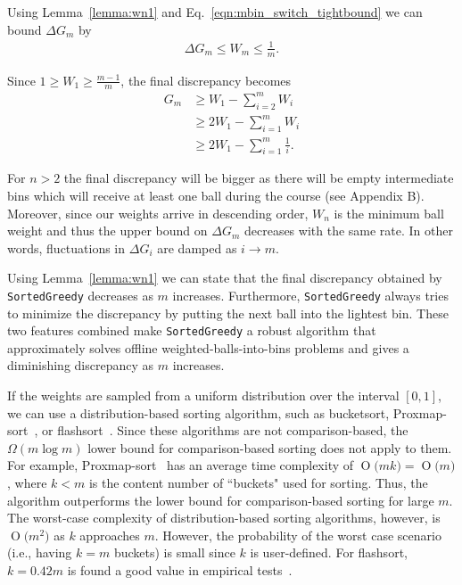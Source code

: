 \documentclass[12pt,psfig,a4]{article}
\newcommand{\sg}{\texttt{SortedGreedy}}
\newcommand{\BigO}[1]{\ensuremath{\operatorname{O}\bigl(#1\bigr)}}
\theoremstyle{plain}
\begin{document}
Using Lemma~\ref{lemma:wn1} and Eq.~\ref{eqn:mbin_switch_tightbound} we can bound $\Delta G_m$ by
 \begin{align}
   \Delta G_m \leq W_m \leq \frac{1}{m}. 
   \label{eqn:bounding2}
 \end{align}
 
Since $1\ge W_1 \geq \frac{m-1}{m} $, the final discrepancy becomes
   \begin{align}
   \nonumber
   G_m & \geq  W_1 - \sum_{i=2}^{m} W_i \\ \nonumber
   & \geq 2W_1 - \sum_{i=1}^{m} W_i \\
   & \geq 2W_1 - \sum_{i=1}^{m} \frac{1}{i}  .
   \label{eqn:gn_sg1}
 \end{align}

For $n>2$ the final discrepancy will be bigger as there will be empty intermediate bins which will receive at least one ball during the course (see Appendix B). Moreover, since our weights arrive in descending order, $W_n$ is the minimum ball weight and thus the upper bound on $\Delta G_m$ decreases with the same rate. In other words, fluctuations in $\Delta G_i$ are damped as $i\to m$. 

Using Lemma~\ref{lemma:wn1} we can state that the final discrepancy obtained by \sg{} decreases as $m$ increases. Furthermore, \sg{} always tries to minimize the discrepancy by putting the next ball into the lightest bin. These two features combined make \sg{} a robust algorithm that approximately solves offline weighted-balls-into-bins problems and gives a diminishing discrepancy as $m$ increases. 

If the weights are sampled from a uniform distribution over the interval $[0,1]$, we can use a distribution-based sorting algorithm, such as bucketsort, Proxmap-sort~\cite{standish1997data}, or flashsort~\cite{neubert1998flashsort}. Since these algorithms are not comparison-based, the $\Omega(m \log{m})$ lower bound for comparison-based sorting does not apply to them. For example, Proxmap-sort~\cite{standish1997data} has an average time complexity of $\BigO{mk}=\BigO{m}$, where $k<m$ is the content number of ``buckets" used for sorting. 
Thus, the algorithm outperforms the lower bound for comparison-based sorting for large $m$. The worst-case complexity of distribution-based sorting algorithms, however, is $\BigO{m^2}$ as $k$ approaches $m$. 
However, the probability of the worst case scenario (i.e., having $k=m$ buckets) is small since $k$ is user-defined. For flashsort, $k=0.42m$ is found a good value in empirical tests~\cite{neubert1998flashsort}.  
\end{document}
